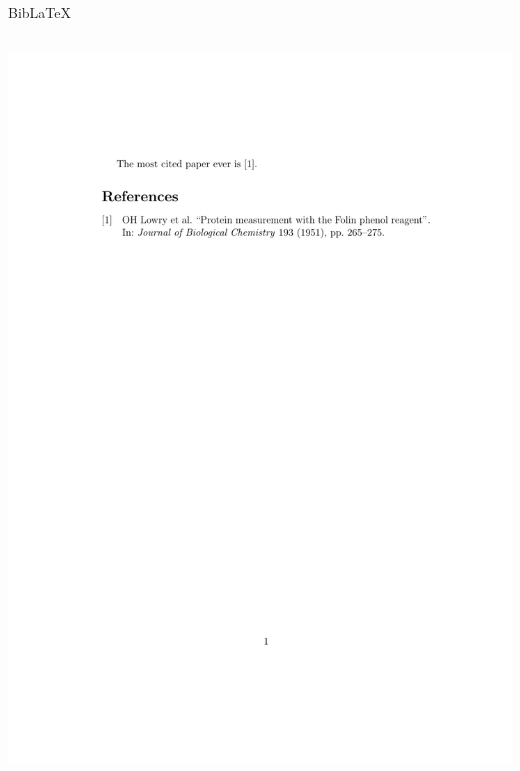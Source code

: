 \documentclass[,aspectratio=43]{beamer}
\begin{document}
\begin{frame}[fragile]{Bib\LaTeX}
\begin{columns}[T]
\begin{column}{0.43\textwidth}
\begin{center}\includegraphics[width=1\linewidth]{figure/biblatex1} \end{center}
\end{column}
\end{columns}
\end{frame}
\end{document}

